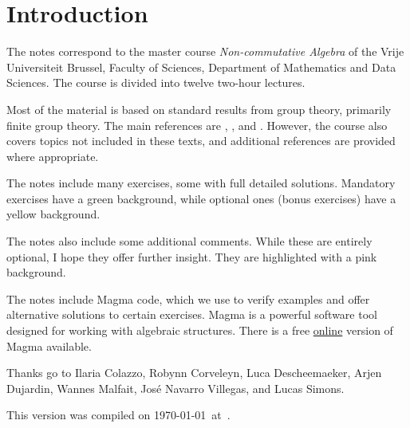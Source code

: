 \thispagestyle{plain}
\section*{Introduction}

The notes correspond to the master  
course \emph{Non-commutative Algebra} of the 
Vrije Universiteit Brussel, 
Faculty of Sciences, 
Department of Mathematics and Data Sciences. The course
is divided into twelve two-hour lectures. 

Most of the material is based on standard results from group theory, primarily finite group theory. The main references are \cite{MR2426855}, \cite{zbMATH00824935}, and \cite{zbMATH00706263}. However, the course also covers topics not included in these texts, and additional references are provided where appropriate.

The notes include many exercises, some with full detailed solutions. Mandatory exercises have a \colorbox{green!5!white}{green background}, while optional ones
(bonus exercises) have a \colorbox{yellow!15!white}{yellow background}.

The notes also include some additional comments. While these are entirely optional, I hope they offer further insight. They are highlighted with a \colorbox{red!5!white}{pink background}.

The notes include Magma code, which we use to verify examples and offer alternative solutions to certain exercises. Magma \cite{zbMATH01077111} is a powerful software tool designed for working with algebraic structures. There is a free \href{https://magma.maths.usyd.edu.au/calc/}{online} version of Magma available.

 
Thanks go to 
Ilaria Colazzo, Robynn Corveleyn, 
Luca Descheemaeker, 
Arjen Dujardin, 
Wannes Malfait, 
José Navarro Villegas, 
and 
Lucas Simons. 

This version 
was compiled on \today~at~\currenttime.


